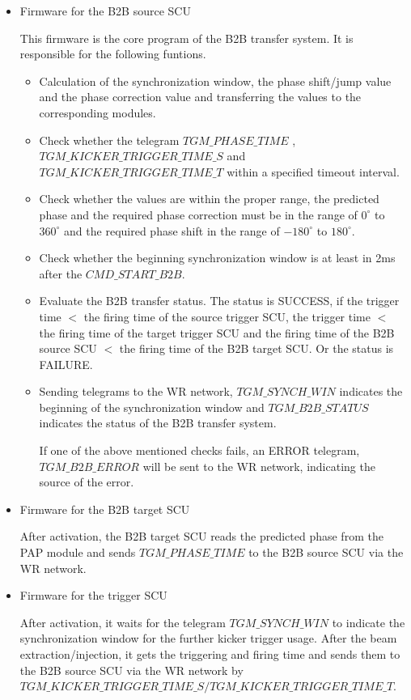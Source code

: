 \begin{itemize}
\item Firmware for the B2B source SCU

This firmware is the core program of the B2B transfer system. It is responsible for the following funtions.
 	\begin{itemize}
 		\item Calculation of the synchronization window, the phase shift/jump value and the phase correction value and transferring the values to the corresponding modules. 
		\item Check whether the telegram $TGM\_PHASE\_TIME$ , $TGM\_ KICKER\_TRIGGER\_TIME\_S$ and $TGM\_KICKER\_TRIGGER\_TIME\_T$ within a specified timeout interval.
		\item Check whether the values are within the proper range, the predicted phase and the required phase correction must be in the range of $0^\circ$ to $360^\circ$ and the required phase shift in the range of $-180^\circ$ to $180^\circ$.
		\item Check whether the beginning synchronization window is at least in 2ms after the $CMD\_START\_B2B$.
		\item Evaluate the B2B transfer status. The status is SUCCESS, if the trigger time $<$ the firing time of the source trigger SCU, the trigger time $<$ the firing time of the target trigger SCU and the firing time of the B2B source SCU $<$ the firing time of the B2B target SCU. Or the status is FAILURE.
		\item Sending telegrams to the WR network, $TGM\_SYNCH\_WIN$ indicates the beginning of the synchronization window and $TGM\_B2B\_STATUS$ indicates the status of the B2B transfer system.

If one of the above mentioned checks fails, an ERROR telegram, $TGM\_B2B\_ERROR$ will be sent to the WR network, indicating the source of the error.
	\end{itemize}
\item Firmware for the B2B target SCU

After activation, the B2B target SCU reads the predicted phase from the PAP module and sends $TGM\_PHASE\_TIME$ to the B2B source SCU via the WR network.

\item Firmware for the trigger SCU

After activation, it waits for the telegram $TGM\_ SYNCH\_ WIN$ to indicate the synchronization window for the further kicker trigger usage. After the beam extraction/injection, it gets the triggering and firing time and sends them  to the B2B source SCU via the WR network by $TGM\_KICKER\_ TRIGGER\_ TIME\_ S/ TGM\_KICKER\_ TRIGGER\_ TIME\_ T$.  
\end{itemize}

